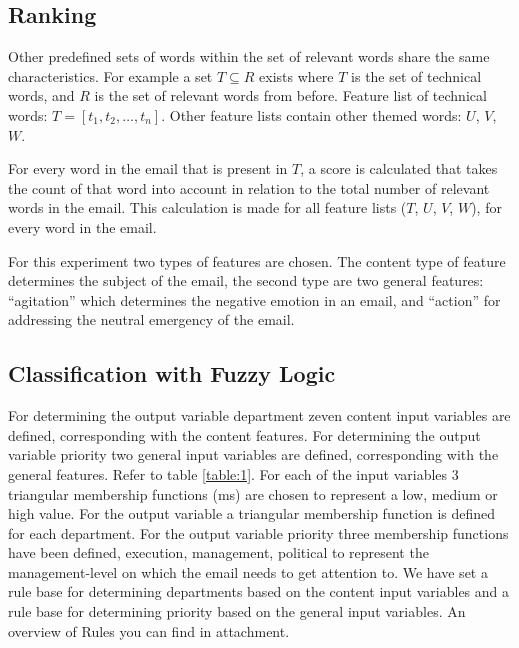 \documentclass[journal]{IEEEtran}
\begin{document}
\subsection{Ranking}

Other predefined sets of words within the set of relevant words share the 
    same characteristics. For example a set $T \subseteq R$ exists where $T$ 
    is the set of technical words, and $R$ is the set of relevant words from 
    before. Feature list of technical words: $T = [t_1, t_2, \dots, t_n]$. 
    Other feature lists contain other themed words: $U$, $V$, $W$.

    For every word in the email that is present in $T$, a score is calculated 
    that takes the count of that word into account in relation to the total 
    number of relevant words in the email. This calculation is made for all 
    feature lists ($T$, $U$, $V$, $W$), for every word in the email.

	For this experiment two types of features are chosen. 
	The content type of feature determines the subject of the email, the second type are two general features: ``agitation'' which determines the negative emotion in an email, and ``action'' for addressing the neutral emergency of the email.

\subsection{Classification with Fuzzy Logic}
    
For determining the output variable department zeven content input variables are defined, corresponding with the content features. For determining the output variable priority two general input variables are defined, corresponding with the general features. Refer to table \ref{table:1}. For each of the input variables 3 triangular membership functions (ms) are chosen to represent a low, medium or high value. For the output variable a triangular membership function is defined for each department. For the output variable priority three membership functions have been defined, execution, management, political to represent the management-level on which the email needs to get attention to.  We have set a rule base for determining departments based on the content input variables and a rule base for determining priority based on the general input variables. An overview of Rules you can find in attachment. \\
\end{document}

